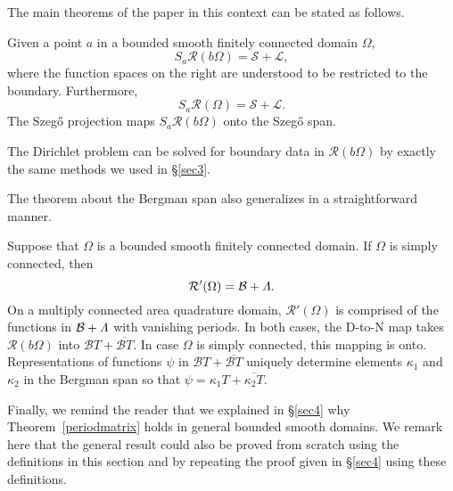 \documentclass[12pt]{amsart}
\newcommand\Om{\Omega}
\numberwithin{equation}{section}
\begin{document}
The main theorems of the paper in this context can be
stated as follows.

\begin{thm}
\label{maing}
Given a point $a$ in a bounded smooth finitely connected
domain $\Om$,
$$S_a{\mathcal R}(b\Om)=\mathcal S+\mathcal L,$$
where the function spaces on the right are understood
to be restricted to the boundary. Furthermore,
$$S_a{\mathcal R}(\Om)=\mathcal S+\mathcal L.$$
The Szeg\H o projection maps $S_a{\mathcal R}(b\Om)$
onto the Szeg\H o span.
\end{thm}

The Dirichlet problem can be solved for boundary data
in ${\mathcal R}(b\Om)$ by exactly the same methods
we used in \S\ref{sec3}.

The theorem about the Bergman span also generalizes in
a straightforward manner.

\begin{thm}
\label{bergmang}
Suppose that $\Om$ is a bounded smooth finitely connected
domain. If $\Om$ is simply connected, then
$${\mathcal R}'(\Om)=\mathcal B+\mathnormal{\Lambda}.$$
On a multiply connected area quadrature domain,
${\mathcal R}'(\Om)$ is comprised of the functions
in $\mathcal B+\mathnormal{\Lambda}$ with vanishing periods.
In both cases, the D-to-N map takes
${\mathcal R}(b\Om)$ into
$\mathcal B T+ \overline{\mathcal B T}$.
In case $\Om$ is simply connected, this mapping is onto.
Representations of functions $\psi$ in
$\mathcal B T+ \overline{\mathcal B T}$
uniquely determine elements $\kappa_1$ and $\kappa_2$
in the Bergman span so that
$\psi=\kappa_1 T +\overline{\kappa_2 T}$.
\end{thm}

Finally, we remind the reader that we explained in
\S\ref{sec4} why Theorem~\ref{periodmatrix} holds in
general bounded smooth domains. We remark here that
the general result could also be proved from scratch
using the definitions in this section and by repeating
the proof given in \S\ref{sec4} using these definitions.
\end{document}
